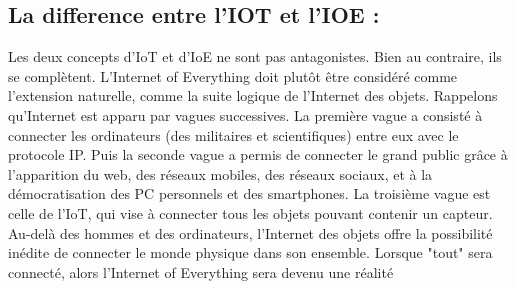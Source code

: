 \subsection{La difference entre l’IOT et l’IOE :}
Les deux concepts d’IoT et d’IoE ne sont pas antagonistes. Bien au contraire, ils se complètent. L’Internet of Everything doit plutôt être considéré comme l’extension naturelle, comme la suite logique de l’Internet des objets. Rappelons qu’Internet est apparu par vagues successives. La première vague a consisté à connecter les ordinateurs (des militaires et scientifiques) entre eux avec le protocole IP. Puis la seconde vague a permis de connecter le grand public grâce à l’apparition du web, des réseaux mobiles, des réseaux sociaux, et à la démocratisation des PC personnels et des smartphones. La troisième vague est celle de l’IoT, qui vise à connecter tous les objets pouvant contenir un capteur. Au-delà des hommes et des ordinateurs, l’Internet des objets offre la possibilité inédite de connecter le monde physique dans son ensemble. Lorsque "tout" sera connecté, alors l’Internet of Everything sera devenu une réalité